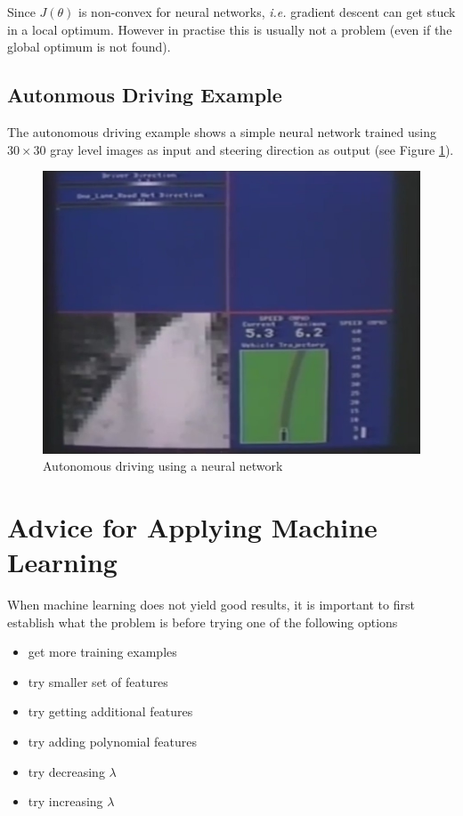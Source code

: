 \documentclass[a4paper,twoside,10pt]{article}
\begin{document}
Since $J(\theta)$ is non-convex for neural networks, \emph{i.e.} gradient descent can get stuck in a local optimum.
However in practise this is usually not a problem (even if the global optimum is not found).

\subsection{Autonmous Driving Example}
The autonomous driving example shows a simple neural network trained using $30\times 30$ gray level images as input and
steering direction as output (see Figure \ref{fig:alvinn}).
\begin{figure}[htbp]
  \begin{center}
    \includegraphics[width=.6\textwidth]{alvinn}
    \caption{Autonomous driving using a neural network\citep{alvinn}\label{fig:alvinn}}
  \end{center}
\end{figure}

\section{Advice for Applying Machine Learning}
When machine learning does not yield good results, it is important to first establish what the problem is before
trying one of the following options
\begin{itemize}
  \item get more training examples
  \item try smaller set of features
  \item try getting additional features
  \item try adding polynomial features
  \item try decreasing $\lambda$
  \item try increasing $\lambda$
\end{itemize}
\end{document}
